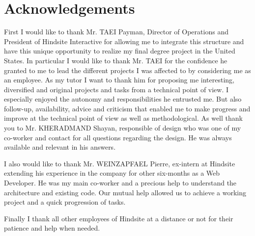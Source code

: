 \chapter*{Acknowledgements}

First I would like to thank Mr. TAEI Payman, Director of Operations and President of
Hindsite Interactive for allowing me to integrate this structure and have this unique
opportunity to realize my final degree project in the United States.
In particular I would like to thank Mr. TAEI for the confidence he granted to me to
lead the different projects I was affected to by considering me as an employee.
As my tutor I want to thank him for proposing me interesting, diversified and original
projects and tasks from a technical point of view. I especially enjoyed the autonomy
and responsibilities he entrusted me. But also follow-up, availability, advice and
criticism that enabled me to make progress and improve at the technical point of
view as well as methodological.
As well thank you to Mr. KHERADMAND Shayan, responsible of design who was
one of my co-worker and contact for all questions regarding the design. He was
always available and relevant in his answers.

I also would like to thank Mr. WEINZAPFAEL Pierre, ex-intern at Hindsite extending his
experience in the company for other six-months as a Web Developer. He was my
main co-worker and a precious help to understand the architecture and existing
code. Our mutual help allowed us to achieve a working project and a quick
progression of tasks.

Finally I thank all other employees of Hindsite at a distance or not for their patience
and help when needed.